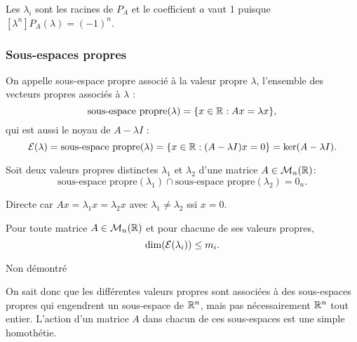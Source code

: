 \proof
Les $\lambda_i$ sont les racines de $P_A$ et le coefficient $a$ vaut 1 puisque $[\lambda^n]P_A(\lambda) = (-1)^n$.
\eproof

\subsubsection{Sous-espaces propres} 

\begin{definition*}
  On appelle sous-espace propre associé à la valeur propre $\lambda$, l'ensemble des vecteurs propres associés à $\lambda$ :
  $$
  \text{sous-espace propre}(\lambda) = \{x \in \mathbb{R}: Ax = \lambda x\},
  $$
  qui est aussi le noyau de $A - \lambda I$ : 
  $$
  \mathcal{E}(\lambda) = \text{sous-espace propre}(\lambda) = \{x \in \mathbb{R}: (A - \lambda I)x = 0\} = \ker(A - \lambda I).
  $$
\end{definition*}

\begin{proposition*}
  Soit deux valeurs propres distinctes $\lambda_1$ et $\lambda_2$ d'une matrice $A \in \mathcal{M}_n(\mathbb{R})$:
  $$
  \text{sous-espace propre}(\lambda_1) \cap \text{sous-espace propre}(\lambda_2) = 0_n.
  $$
\end{proposition*}

\proof
Directe car $Ax = \lambda_1 x = \lambda_2 x$ avec $\lambda_1 \neq \lambda_2$ ssi $x = 0$.
\eproof


\begin{proposition*}
  Pour toute matrice $A \in \mathcal{M}_n(\mathbb{R})$ et pour chacune de ses valeurs propres, 
  $$
  \dim(\mathcal{E}(\lambda_i)) \leq m_i.
  $$
\end{proposition*}

\proof
Non démontré
\eproof

\remark
On sait donc que les différentes valeurs propres sont associées à des sous-espaces propres qui engendrent un sous-espace de $\mathbb{R}^n$, mais pas nécessairement $\mathbb{R}^n$ tout entier. L'action d'un matrice $A$ dans chacun de ces sous-espaces est une simple homothétie.

\bigskip
{}

